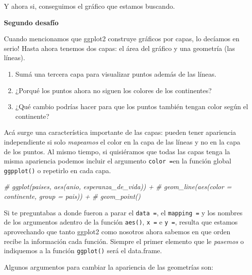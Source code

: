 \documentclass[
  openany]{book}
\newenvironment{Shaded}{\begin{snugshade}}{\end{snugshade}}
\newcommand{\CommentTok}[1]{\textcolor[rgb]{0.56,0.35,0.01}{\textit{#1}}}
\providecommand{\tightlist}{%
  \setlength{\itemsep}{0pt}\setlength{\parskip}{0pt}}
\begin{document}
Y ahora si, conseguimos el gráfico que estamos buscando.

\textbf{Segundo desafío}

Cuando mencionamos que ggplot2 construye gráficos por capas, lo decíamos en serio!
Hasta ahora tenemos dos capas: el área del gráfico y una geometría (las líneas).

\begin{enumerate}
\def\labelenumi{\arabic{enumi}.}
\tightlist
\item
  Sumá una tercera capa para visualizar puntos además de las líneas.
\item
  ¿Porqué los puntos ahora no siguen los colores de los continentes?
\item
  ¿Qué cambio podrías hacer para que los puntos también tengan color según el continente?
\end{enumerate}

Acá surge una característica importante de las capas: pueden tener apariencia independiente si solo \emph{mapeamos} el color en la capa de las líneas y no en la capa de los puntos.
Al mismo tiempo, si quisiéramos que todas las capas tenga la misma apariencia podemos incluir el argumento \texttt{color\ =}en la función global \texttt{ggpplot()} o repetirlo en cada capa.

\begin{Shaded}
\begin{Highlighting}[]
\CommentTok{\# ggplot(paises, aes(anio, esperanza\_de\_vida)) +}
\CommentTok{\#   geom\_line(aes(color = continente, group = pais)) +}
\CommentTok{\#   geom\_point()}
\end{Highlighting}
\end{Shaded}

Si te preguntabas a donde fueron a parar el \texttt{data\ =}, el \texttt{mapping\ =} y los nombres de los argumentos adentro de la función \texttt{aes()}, \texttt{x\ =} e \texttt{y\ =}, resulta que estamos aprovechando que tanto ggplot2 como nosotros ahora sabemos en que orden recibe la información cada función.
Siempre el primer elemento que le \emph{pasemos} o indiquemos a la función \texttt{ggplot()} será el data.frame.

Algunos argumentos para cambiar la apariencia de las geometrías son:
\end{document}
